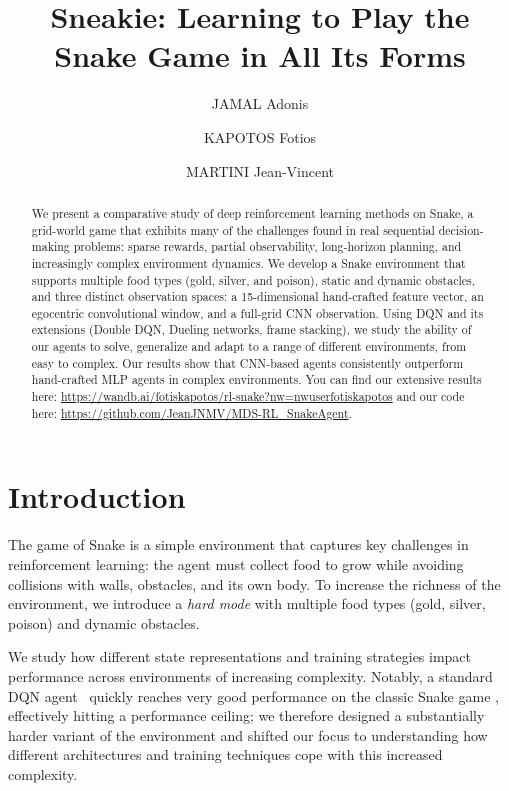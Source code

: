 \documentclass[runningheads]{llncs}
\begin{document}
\title{Sneakie: Learning to Play the Snake Game in All Its Forms}

\author{JAMAL Adonis \and  KAPOTOS Fotios \and MARTINI Jean-Vincent }
\maketitle

\begin{abstract}
We present a comparative study of deep reinforcement learning methods on Snake,
a grid-world game that exhibits many of the challenges found in real sequential
decision-making problems: sparse rewards, partial observability, long-horizon
planning, and increasingly complex environment dynamics.
We develop a Snake environment that supports multiple food types (gold, silver, and poison), static and dynamic obstacles, and three distinct observation spaces: a 15-dimensional hand-crafted feature
vector, an egocentric convolutional window, and a full-grid CNN observation.
Using DQN and its extensions (Double DQN, Dueling networks, frame stacking), we study the ability of our agents to solve, generalize and adapt to a range of different environments, from easy to complex.
Our results show that CNN-based agents consistently outperform hand-crafted
MLP agents in complex environments.
You can find our extensive results here: \url{https://wandb.ai/fotiskapotos/rl-snake?nw=nwuserfotiskapotos} and our code here: \url{https://github.com/JeanJNMV/MDS-RL_SnakeAgent}.
\end{abstract}

\section{Introduction}
\label{sec:intro}

The game of Snake is a simple environment that captures key challenges in
reinforcement learning: the agent must collect food to grow while avoiding
collisions with walls, obstacles, and its own body.
To increase the richness of the environment, we introduce a \emph{hard mode}
with multiple food types (gold, silver, poison) and dynamic obstacles.

We study how different state representations and training strategies impact
performance across environments of increasing complexity.
Notably, a standard DQN agent~\cite{mnih2015human} quickly reaches very good performance on the classic Snake game \cite{wei2018autonomous}, effectively hitting a performance ceiling; we therefore designed a substantially harder variant of the environment and shifted our focus to understanding how different architectures and training techniques cope with this increased complexity.
\end{document}
